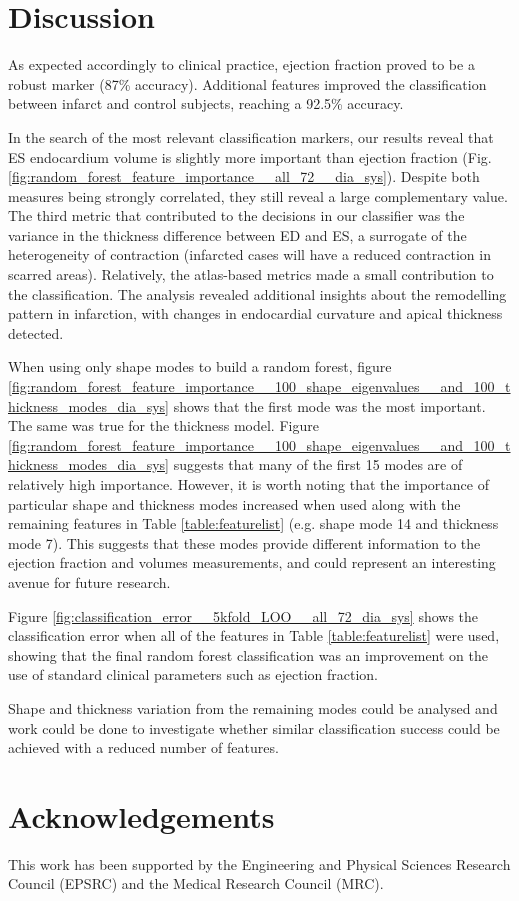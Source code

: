 \documentclass{llncs}
\begin{document}
\section{Discussion}
As expected accordingly to clinical practice, ejection fraction proved to be a robust marker (87\% accuracy). Additional features improved the classification between infarct and control subjects, reaching a 92.5\% accuracy.

In the search of the most relevant classification markers, our results reveal that ES endocardium volume is slightly more important than ejection fraction (Fig. \ref{fig:random_forest_feature_importance__all_72__dia_sys}). Despite both measures being strongly correlated, they still reveal a large complementary value. The third metric that contributed to the decisions in our classifier was the variance in the thickness difference between ED and ES, a surrogate of the heterogeneity of contraction (infarcted cases will have a reduced contraction in scarred areas). Relatively, the atlas-based metrics made a small contribution to the classification. The analysis revealed additional insights about the remodelling pattern in infarction, with changes in endocardial curvature and apical thickness detected.

When using only shape modes to build a random forest, figure     \ref{fig:random_forest_feature_importance__100_shape_eigenvalues__and_100_thickness_modes_dia_sys} shows that the first mode was the most important. The same was true for the thickness model. Figure \ref{fig:random_forest_feature_importance__100_shape_eigenvalues__and_100_thickness_modes_dia_sys} suggests that many of the first 15 modes are of relatively high importance. However, it is worth noting that the importance of particular shape and thickness modes increased when used along with the remaining features in Table \ref{table:featurelist} (e.g. shape mode 14 and thickness mode 7). This suggests that these modes provide different information to the ejection fraction and volumes measurements, and could represent an interesting avenue for future research.

Figure \ref{fig:classification_error__5kfold_LOO__all_72_dia_sys} shows the classification error when all of the features in Table \ref{table:featurelist} were used, showing that the final random forest classification was an improvement on the use of standard clinical parameters such as ejection fraction.

Shape and thickness variation from the remaining modes could be analysed and work could be done to investigate whether similar classification success could be achieved with a reduced number of features. 

 




\section{Acknowledgements}
This work has been supported by the Engineering and Physical Sciences Research Council (EPSRC) and the Medical Research Council (MRC).


\end{document}
